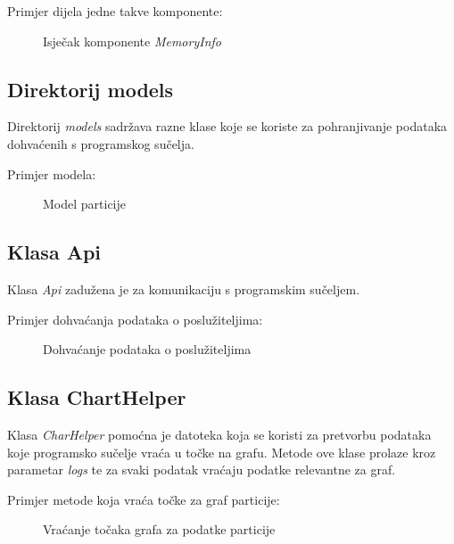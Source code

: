 \documentclass[zavrsnirad]{fer}
\begin{document}
Primjer dijela jedne takve komponente:
\begin{figure}[htb]
	\centering
	
	\caption{Isječak komponente \textit{MemoryInfo}}
\end{figure}
\FloatBarrier

\subsection{Direktorij models}
Direktorij \textit{models} sadržava razne klase koje se koriste za pohranjivanje podataka dohvaćenih s programskog sučelja.

Primjer modela:
\begin{figure}[htb]
	\centering
	
	\caption{Model particije}
\end{figure}
\FloatBarrier

\subsection{Klasa Api}
Klasa \textit{Api} zadužena je za komunikaciju s programskim sučeljem.

Primjer dohvaćanja podataka o poslužiteljima:
\begin{figure}[htb]
	\centering
	
	\caption{Dohvaćanje podataka o poslužiteljima}
\end{figure}
\FloatBarrier

\subsection{Klasa ChartHelper}
Klasa \textit{CharHelper} pomoćna je datoteka koja se koristi za pretvorbu podataka koje programsko sučelje vraća u točke na grafu. Metode ove klase prolaze kroz parametar \textit{logs} te za svaki podatak vraćaju podatke relevantne za graf.

Primjer metode koja vraća točke za graf particije:
\begin{figure}[htb]
	\centering
	
	\caption{Vraćanje točaka grafa za podatke particije}
\end{figure}
\FloatBarrier
\end{document}
